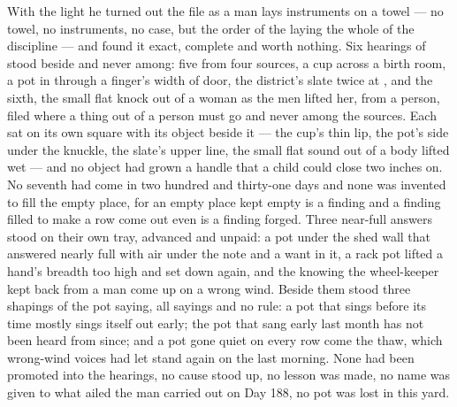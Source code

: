 With the light he turned out the file as a man lays instruments on a towel --- no towel, no instruments, no case, but the order of the laying the whole of the discipline --- and found it exact, complete and worth nothing. Six hearings of  stood beside and never among: five from four sources, a cup across a birth room, a pot in  through a finger's width of door, the district's slate twice at , and the sixth, the small flat knock out of a woman as the men lifted her, from a person, filed where a thing out of a person must go and never among the sources. Each sat on its own square with its object beside it --- the cup's thin lip, the pot's side under the knuckle, the slate's upper line, the small flat sound out of a body lifted wet --- and no object had grown a handle that a child could close two inches on. No seventh had come in two hundred and thirty-one days and none was invented to fill the empty place, for an empty place kept empty is a finding and a finding filled to make a row come out even is a finding forged. Three near-full answers stood on their own tray, advanced and unpaid: a pot under the shed wall that answered nearly full with air under the note and a want in it, a rack pot lifted a hand's breadth too high and set down again, and the knowing the wheel-keeper kept back from a man come up on a wrong wind. Beside them stood three shapings of the pot saying, all sayings and no rule: a pot that sings before its time mostly sings itself out early; the pot that sang early last month has not been heard from since; and a pot gone quiet on every row come the thaw, which wrong-wind voices had let stand again on the last morning. None had been promoted into the hearings, no cause stood up, no lesson was made, no name was given to what ailed the man carried out on Day 188, no pot was lost in this yard.

